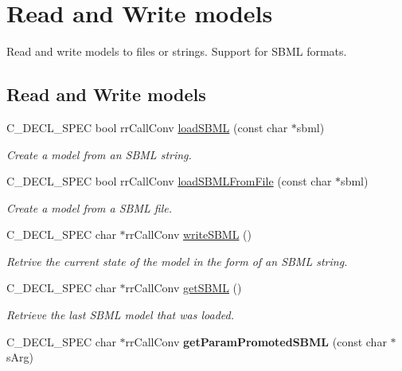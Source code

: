 \hypertarget{group__loadsave}{
\section{\-Read and \-Write models}
\label{group__loadsave}
}


\-Read and write models to files or strings. \-Support for \-S\-B\-M\-L formats.  


\subsection*{\-Read and \-Write models}
\begin{DoxyCompactItemize}
\item 
\-C\-\_\-\-D\-E\-C\-L\-\_\-\-S\-P\-E\-C bool rr\-Call\-Conv \hyperlink{group__loadsave_ga4105f02dfdb959175f30cecebfb1c081}{load\-S\-B\-M\-L} (const char $\ast$sbml)
\begin{DoxyCompactList}\small\item\em \-Create a model from an \-S\-B\-M\-L string. \end{DoxyCompactList}\item 
\-C\-\_\-\-D\-E\-C\-L\-\_\-\-S\-P\-E\-C bool rr\-Call\-Conv \hyperlink{group__loadsave_ga3147e10d84bddb6435bee4b1db0514bf}{load\-S\-B\-M\-L\-From\-File} (const char $\ast$sbml)
\begin{DoxyCompactList}\small\item\em \-Create a model from a \-S\-B\-M\-L file. \end{DoxyCompactList}\item 
\-C\-\_\-\-D\-E\-C\-L\-\_\-\-S\-P\-E\-C char $\ast$rr\-Call\-Conv \hyperlink{group__loadsave_ga7d683d70e6966107f81a3e8c547bcd76}{write\-S\-B\-M\-L} ()
\begin{DoxyCompactList}\small\item\em \-Retrive the current state of the model in the form of an \-S\-B\-M\-L string. \end{DoxyCompactList}\item 
\-C\-\_\-\-D\-E\-C\-L\-\_\-\-S\-P\-E\-C char $\ast$rr\-Call\-Conv \hyperlink{group__loadsave_ga05a79ded419b52fa2965fce1700c0e82}{get\-S\-B\-M\-L} ()
\begin{DoxyCompactList}\small\item\em \-Retrieve the last \-S\-B\-M\-L model that was loaded. \end{DoxyCompactList}\item 
\hypertarget{group__loadsave_ga4add8092e50aedd665cd073133838620}{
\-C\-\_\-\-D\-E\-C\-L\-\_\-\-S\-P\-E\-C char $\ast$rr\-Call\-Conv {\bfseries get\-Param\-Promoted\-S\-B\-M\-L} (const char $\ast$s\-Arg)}
\label{group__loadsave_ga4add8092e50aedd665cd073133838620}


\end{DoxyCompactItemize}

